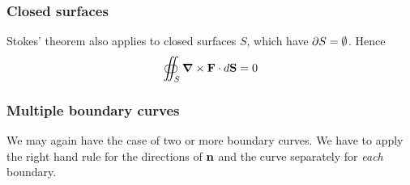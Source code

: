 \documentclass{../../template/note}
\begin{document}
    \subsubsection{Closed surfaces}

    Stokes' theorem also applies to closed surfaces \(S\), which have \(\partial S = \emptyset\). Hence
    \begin{align*}
        \oiint_S \curl \V F \cdot d\V S = 0
    \end{align*}
    
    \subsubsection{Multiple boundary curves}
    
    We may again have the case of two or more boundary curves. We have to apply the right hand rule for the directions of \(\V n\) and the curve separately for \emph{each} boundary.
    
\end{document}
